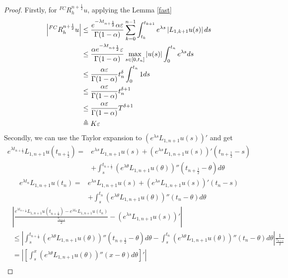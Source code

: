 \documentclass[10pt, reqno]{amsart}
\theoremstyle{remark}
\theoremstyle{definition}
\numberwithin{table}{section}
\begin{document}
\begin{proof}
Firstly, for ${}^{FC}R^{n+\frac{1}{2}}_hu$, applying the Lemma \ref{fast}
\begin{align}
        \left|{}^{FC}R^{n+\frac{1}{2}}_hu\right|&\leq \frac{ e^{-\lambda t_{n+\frac{1}{2}}}\alpha \varepsilon}{\Gamma(1-\alpha)}\sum_{k=0}^{n-1}\int_{t_k}^{t_{k+1}}e^{\lambda s}\left|L_{1, k+1}u(s) \right|ds \notag\\
&\leq \frac{\alpha e^{-\lambda t_{n+\frac{1}{2}}}\varepsilon}{\Gamma(1-\alpha)}\max_{s\in [0, t_n]}|u(s)|\int_0^{t_n}e^{\lambda s}ds\notag\\
&\leq \frac{\alpha \varepsilon}{\Gamma(1-\alpha)} t_n^\delta\int_0^{t_n}1ds \notag\\
&\leq \frac{\alpha \varepsilon}{\Gamma(1-\alpha)}t_n^{\delta+1}\notag\\
&\leq \frac{\alpha \varepsilon}{\Gamma(1-\alpha)}T^{\delta+1}\notag\\
&\triangleq{} K\varepsilon
\end{align}
Secondly, we can use the Taylor expansion to $(e^{\lambda s}L_{1, n+1}u(s))'$ and get
\begin{align*}
e^{\lambda t_{n+\frac{1}{2}}} L_{1,  n+1} u\left(t_{n+\frac{1}{2}}\right)=&e^{\lambda s}L_{1, n+1}u(s)+(e^{\lambda s}L_{1, n+1}u(s))'(t_{n+\frac{1}{2}}-s)\\
&+\int_{s}^{t_{n+\frac{1}{2}}}(e^{\lambda \theta}L_{1, n+1}u(\theta))''(t_{n+\frac{1}{2}}-\theta)d\theta
\end{align*}
\begin{align*}
e^{\lambda t_{n}} L_{1,  n+1} u\left(t_{n}\right)=&e^{\lambda s}L_{1, n+1}u(s)+(e^{\lambda s}L_{1, n+1}u(s))'(t_{n}-s)\\
&+\int_{s}^{t_{n}}(e^{\lambda \theta}L_{1, n+1}u(\theta))''(t_{n}-\theta)d\theta
\end{align*}
\begin{equation}
    \begin{aligned}\label{fe1}
        &\left|\frac{e^{\lambda t_{n+\frac{1}{2}}} L_{1,  n+1} u\left(t_{n+\frac{1}{2}}\right)-e^{\lambda t_{n}} L_{1,  n+1} u\left(t_{n}\right)}{\frac{\tau_{n+1}}{2}} -(e^{\lambda s}L_{1, n+1}u(s))'\right|\\
        &\leq \left|\int_{s}^{t_{n+\frac{1}{2}}}(e^{\lambda \theta}L_{1, n+1}u(\theta))''(t_{n+\frac{1}{2}}-\theta)d\theta-\int_{s}^{t_{n}}(e^{\lambda \theta}L_{1, n+1}u(\theta))''(t_{n}-\theta)d\theta\right|\frac{1}{\frac{\tau_{n+1}}{2}}\\
        &=\left|[\int_{s}^{x}(e^{\lambda \theta}L_{1, n+1}u(\theta))''(x-\theta)d\theta]'\right|\\

\end{aligned}
\end{equation}
\end{proof}
\end{document}
